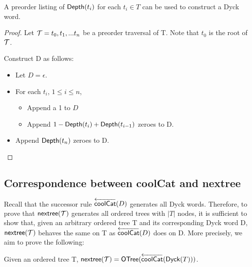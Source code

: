 \begin{remark}A preorder listing of $\mathsf{Depth}{(t_i)} $ for each $ t_i \in T$ can be used to construct a Dyck word. \label{re:construct_dyck}

\end{remark} 
\begin{proof}

    Let $\mathcal{T}=t_0,t_1,...t_n$ be a preorder traversal of T.  Note that $t_0$ is the root of $\mathcal{T}$.

    Construct D as follows: 

    \begin{itemize}
	\item Let $D=\epsilon$. %
	\item For each $t_i$, $1\le i \le n$,
	    \begin{itemize}
		\item Append a 1 to $D$
		\item Append $1-\mathsf{Depth}{(t_{i})}+\mathsf{Depth}{(t_{i-1})}$ zeroes to D.
	    \end{itemize}
	\item Append $\mathsf{Depth}{(t_{n})}$ zeroes to D. 
    \end{itemize}
\end{proof} 

\subsection{Correspondence between coolCat and nextree}
Recall that the successor rule $\overleftarrow{\mathsf{coolCat}}{(D)}$ generates all Dyck words.  Therefore,  to prove that $\mathsf{nextree}{(\mathcal{T})}$ generates all ordered trees with $|T|$ nodes, it is sufficient to show that, given an arbitrary ordered tree T and its corresponding Dyck word D, $\mathsf{nextree}{(\mathcal{T})}$ behaves the same on T as $\overleftarrow{\mathsf{coolCat}}{(D)}$ does on D. More precisely, we aim to prove the following: 



\begin{theorem}
    Given an ordered tree T, $\mathsf{nextree}{(\mathcal{T})}=\mathsf{OTree}{(\overleftarrow{\mathsf{coolCat}}{(\mathsf{Dyck}{(T)})})}$.
\end{theorem}

